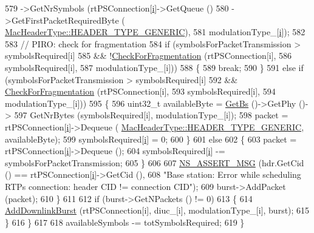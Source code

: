 \begin{DoxyCode}
579             ->GetNrSymbols (rtPSConnection[\hyperlink{bernuolliDistribution_8m_a6f6ccfcf58b31cb6412107d9d5281426}{i}]->GetQueue ()
580                             ->GetFirstPacketRequiredByte (
      \hyperlink{classns3_1_1MacHeaderType_a54d8fc8bc93a2b7865627965cdd31c20a48fe5b2f20cadf78008c71469b518403}{MacHeaderType::HEADER\_TYPE\_GENERIC}),
581                             modulationType\_[\hyperlink{bernuolliDistribution_8m_a6f6ccfcf58b31cb6412107d9d5281426}{i}]);
582 
583           \textcolor{comment}{// PIRO: check for fragmentation}
584           \textcolor{keywordflow}{if} (symbolsForPacketTransmission > symbolsRequired[i]
585               && !\hyperlink{classns3_1_1BSScheduler_aedd94450afdda0371fae56e05624bfaf}{CheckForFragmentation} (rtPSConnection[i],
586                                          symbolsRequired[i],
587                                          modulationType\_[i]))
588             \{
589               \textcolor{keywordflow}{break};
590             \}
591           \textcolor{keywordflow}{else} \textcolor{keywordflow}{if} (symbolsForPacketTransmission > symbolsRequired[i]
592                    && \hyperlink{classns3_1_1BSScheduler_aedd94450afdda0371fae56e05624bfaf}{CheckForFragmentation} (rtPSConnection[i],
593                                              symbolsRequired[i],
594                                              modulationType\_[i]))
595             \{
596               uint32\_t availableByte = \hyperlink{classns3_1_1BSScheduler_a8b09065ac8f74cb35446af55128e41c7}{GetBs} ()->GetPhy ()->
597                 GetNrBytes (symbolsRequired[i], modulationType\_[i]);
598               packet = rtPSConnection[\hyperlink{bernuolliDistribution_8m_a6f6ccfcf58b31cb6412107d9d5281426}{i}]->Dequeue (
      \hyperlink{classns3_1_1MacHeaderType_a54d8fc8bc93a2b7865627965cdd31c20a48fe5b2f20cadf78008c71469b518403}{MacHeaderType::HEADER\_TYPE\_GENERIC}, availableByte);
599               symbolsRequired[\hyperlink{bernuolliDistribution_8m_a6f6ccfcf58b31cb6412107d9d5281426}{i}] = 0;
600             \}
601           \textcolor{keywordflow}{else}
602             \{
603               packet = rtPSConnection[\hyperlink{bernuolliDistribution_8m_a6f6ccfcf58b31cb6412107d9d5281426}{i}]->Dequeue ();
604               symbolsRequired[\hyperlink{bernuolliDistribution_8m_a6f6ccfcf58b31cb6412107d9d5281426}{i}] -= symbolsForPacketTransmission;
605             \}
606 
607           \hyperlink{assert_8h_aff5ece9066c74e681e74999856f08539}{NS\_ASSERT\_MSG} (hdr.GetCid () == rtPSConnection[\hyperlink{bernuolliDistribution_8m_a6f6ccfcf58b31cb6412107d9d5281426}{i}]->GetCid (),
608                          \textcolor{stringliteral}{"Base station: Error while scheduling RTPs connection: header CID != connection
       CID"});
609           burst->AddPacket (packet);
610         \}
611 
612       \textcolor{keywordflow}{if} (burst->GetNPackets () != 0)
613         \{
614           \hyperlink{classns3_1_1BSSchedulerRtps_ab58c3772737a8fcd20ec05680253b087}{AddDownlinkBurst} (rtPSConnection[i], diuc\_[i], modulationType\_[i], burst);
615         \}
616     \}
617 
618   availableSymbols -= totSymbolsRequired;
619 \}
\end{DoxyCode}


